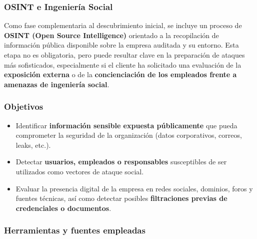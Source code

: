 \documentclass[a4paper, 11pt]{article}
\begin{document}
\par\vspace{0.5cm}






\subsubsection{OSINT e Ingeniería Social}

Como fase complementaria al descubrimiento inicial, se incluye un proceso de \textbf{OSINT (Open Source Intelligence)} orientado a la recopilación de información pública disponible sobre la empresa auditada y su entorno. Esta etapa no es obligatoria, pero puede resultar clave en la preparación de ataques más sofisticados, especialmente si el cliente ha solicitado una evaluación de la \textbf{exposición externa} o de la \textbf{concienciación de los empleados frente a amenazas de ingeniería social}.

\vspace{0.5cm}
\subsubsection*{Objetivos}

\begin{itemize}
    \item Identificar \textbf{información sensible expuesta públicamente} que pueda comprometer la seguridad de la organización (datos corporativos, correos, leaks, etc.).
    \item Detectar \textbf{usuarios, empleados o responsables} susceptibles de ser utilizados como vectores de ataque social.
    \item Evaluar la presencia digital de la empresa en redes sociales, dominios, foros y fuentes técnicas, así como detectar posibles \textbf{filtraciones previas de credenciales o documentos}.
\end{itemize}

\vspace{0.5cm}
\subsubsection*{Herramientas y fuentes empleadas}
\end{document}
